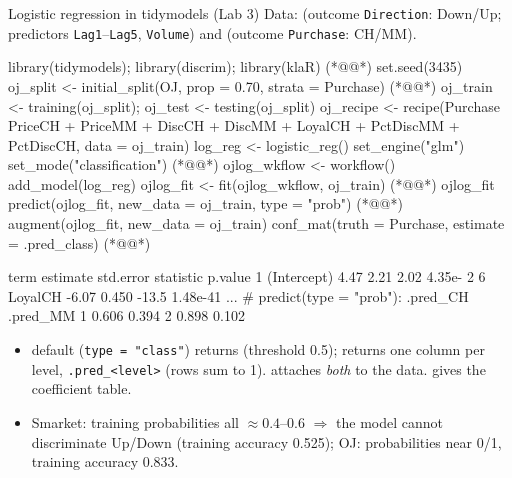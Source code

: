 \begin{topic}{Logistic regression in tidymodels (Lab 3)}
\quad Data:  (outcome \texttt{Direction}: Down/Up; predictors
\texttt{Lag1}--\texttt{Lag5}, \texttt{Volume}) and  (outcome \texttt{Purchase}: CH/MM).
\begin{rcode}
library(tidymodels); library(discrim); library(klaR)  (*@@*)
set.seed(3435)
oj_split <- initial_split(OJ, prop = 0.70, strata = Purchase)  (*@@*)
oj_train <- training(oj_split); oj_test <- testing(oj_split)
oj_recipe <- recipe(Purchase ~ PriceCH + PriceMM + DiscCH + DiscMM +
                      LoyalCH + PctDiscMM + PctDiscCH, data = oj_train)
log_reg <- logistic_reg() %
  set_engine("glm") %
  set_mode("classification")                      (*@@*)
ojlog_wkflow <- workflow() %
  add_model(log_reg) %
ojlog_fit <- fit(ojlog_wkflow, oj_train)          (*@@*)
ojlog_fit %
predict(ojlog_fit, new_data = oj_train, type = "prob")  (*@@*)
augment(ojlog_fit, new_data = oj_train) %
  conf_mat(truth = Purchase, estimate = .pred_class)  (*@@*)
\end{rcode}
\begin{routput}
  term        estimate std.error statistic  p.value
1 (Intercept)     4.47     2.21      2.02  4.35e- 2
6 LoyalCH        -6.07     0.450   -13.5   1.48e-41
...
# predict(type = "prob"):   .pred_CH .pred_MM
                         1     0.606    0.394
                         2     0.898    0.102
\end{routput}
\begin{itemize}
\item {} default (\texttt{type = "class"}) returns  (threshold 0.5);
   returns one column per level, \texttt{.pred\_<level>} (rows sum to 1).
   attaches \emph{both} to the data.  gives the coefficient table.
\item Smarket: training probabilities all $\approx0.4$--$0.6$ $\Rightarrow$ the model cannot discriminate Up/Down
  (training accuracy 0.525); OJ: probabilities near 0/1, training accuracy 0.833.
\end{itemize}
\end{topic}

